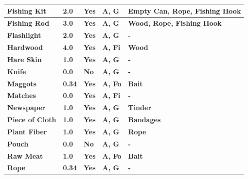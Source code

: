\begin{longtable}{|C{10.555em}|C{4.0em}|C{4.0em}|C{6.445em}|C{11.055em}|}
			    \midrule
			     \textbf{Fishing Kit} & \textbf{2.0} & \textbf{Yes} & \textbf{A, G} & \textbf{Empty Can, Rope, Fishing Hook} \\
			    \midrule
			     \textbf{Fishing Rod} & \textbf{3.0} & \textbf{Yes} & \textbf{A, G} & \textbf{Wood, Rope, Fishing Hook} \\
			    \midrule
			     \textbf{Flashlight} & \textbf{2.0} & \textbf{Yes} & \textbf{A, G} & \textbf{-} \\
			    \midrule
			     \textbf{Hardwood} & \textbf{4.0} & \textbf{Yes} & \textbf{A, Fi} & \textbf{Wood} \\
			    \midrule
			     \textbf{Hare Skin} & \textbf{1.0} & \textbf{Yes} & \textbf{A, G} & \textbf{-} \\
			    \midrule
			     \textbf{Knife} & \textbf{0.0} & \textbf{No} & \textbf{A, G} & \textbf{-} \\
			    \midrule
			     \textbf{Maggots} & \textbf{0.34} & \textbf{Yes} & \textbf{A, Fo} & \textbf{Bait} \\
			    \midrule
			     \textbf{Matches} & \textbf{0.0} & \textbf{Yes} & \textbf{A, Fi} & \textbf{-} \\
			    \midrule
			     \textbf{Newspaper} & \textbf{1.0} & \textbf{Yes} & \textbf{A, G} & \textbf{Tinder} \\
			    \midrule
			     \textbf{Piece of Cloth} & \textbf{1.0} & \textbf{Yes} & \textbf{A, G} & \textbf{Bandages} \\
			    \midrule
			     \textbf{Plant Fiber} & \textbf{1.0} & \textbf{Yes} & \textbf{A, G} & \textbf{Rope} \\
			    \midrule
			     \textbf{Pouch} & \textbf{0.0} & \textbf{No} & \textbf{A, G} & \textbf{-} \\
			    \midrule
			     \textbf{Raw Meat} & \textbf{1.0} & \textbf{Yes} & \textbf{A, Fo} & \textbf{Bait} \\
			    \midrule
			     \textbf{Rope} & \textbf{0.34} & \textbf{Yes} & \textbf{A, G} & \textbf{-} \\
			    \midrule

\end{longtable}
